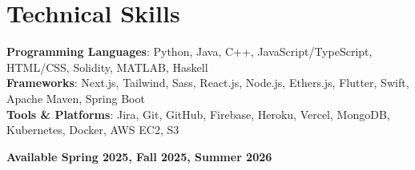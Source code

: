 \documentclass[letterpaper,11pt]{article}
\begin{document}
\section{Technical Skills}
 \begin{itemize}[leftmargin=0.15in, label={}]
    \small{\item{
     \textbf{Programming Languages}{: Python, Java, C++, JavaScript/TypeScript, HTML/CSS, Solidity, MATLAB, Haskell} \\
     \textbf{Frameworks}{: Next.js, Tailwind, Sass, React.js, Node.js, Ethers.js, Flutter, Swift, Apache Maven, Spring Boot} \\
     \textbf{Tools \& Platforms}{: Jira, Git, GitHub, Firebase, Heroku, Vercel, MongoDB, Kubernetes, Docker, AWS EC2, S3}
    }}
 \end{itemize}


 \begin{center}
  \textbf{Available Spring 2025, Fall 2025, Summer 2026}
\end{center}



\end{document}
